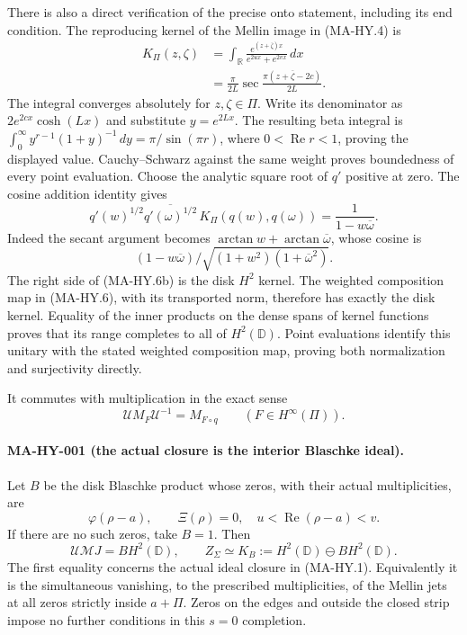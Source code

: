 There is also a direct verification of the precise onto statement,
including its end condition.  The reproducing kernel of the
Mellin image in (MA-HY.4) is
\[
\begin{aligned}
 K_\Pi(z,\zeta)
 &=\int_{\mathbb R}
     \frac{e^{(z+\overline\zeta)x}}{e^{2ux}+e^{2vx}}\,dx\\
 &=\frac{\pi}{2L}
     \sec\frac{\pi(z+\overline\zeta-2c)}{2L}.
\end{aligned}
\tag{MA-HY.6a}
\]
The integral converges absolutely for $z,\zeta\in\Pi$.
Write its denominator as $2e^{2cx}\cosh(Lx)$ and substitute
$y=e^{2Lx}$.  The resulting beta integral is
$\int_0^\infty y^{r-1}(1+y)^{-1}\,dy=\pi/\sin(\pi r)$,
where $0<\operatorname{Re}r<1$, proving the displayed value.
Cauchy--Schwarz against the same weight proves boundedness
of every point evaluation.  Choose the analytic square root
of $q'$ positive at zero.  The cosine addition identity gives
\[
 q'(w)^{1/2}\overline{q'(\omega)^{1/2}}\,
 K_\Pi(q(w),q(\omega))
             =\frac1{1-w\overline\omega}.
\tag{MA-HY.6b}
\]
Indeed the secant argument becomes
$\arctan w+\arctan\overline\omega$, whose cosine is
\[
 (1-w\overline\omega)/
 \sqrt{(1+w^2)(1+\overline\omega^2)}.
\]
The right side of (MA-HY.6b) is the disk $H^2$ kernel.
The weighted composition map in (MA-HY.6), with its transported
norm, therefore has exactly the disk kernel.  Equality of the
inner products on the dense spans of kernel functions proves
that its range completes to all of $H^2(\mathbb D)$.
Point evaluations identify this unitary with the stated
weighted composition map, proving both normalization and
surjectivity directly.

It commutes with multiplication in the exact sense
\[
        \mathcal U M_F\mathcal U^{-1}=M_{F\circ q}
                    \qquad(F\in H^\infty(\Pi)).
 \tag{MA-HY.7}
\]

\paragraph{MA-HY-001 (the actual closure is the interior Blaschke ideal).}
Let $B$ be the disk Blaschke product whose zeros, with their
actual multiplicities, are
\[
       \varphi(\rho-a),\qquad
       \Xi(\rho)=0,\quad u<\operatorname{Re}(\rho-a)<v.
 \tag{MA-HY.8}
\]
If there are no such zeros, take $B=1$.
Then
\[
 \mathcal U\mathcal M J=B H^2(\mathbb D),\qquad
       Z_\Sigma\simeq K_B:=H^2(\mathbb D)\ominus B H^2(\mathbb D).
 \tag{MA-HY.9}
\]
The first equality concerns the actual ideal closure in (MA-HY.1).
Equivalently it is the simultaneous vanishing, to the prescribed
multiplicities, of the Mellin jets at all zeros strictly inside
$a+\Pi$.  Zeros on the edges and outside the closed strip impose
no further conditions in this $s=0$ completion.

